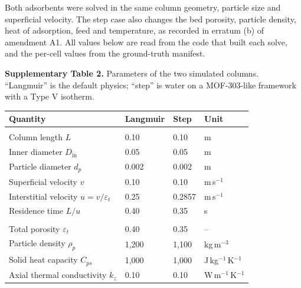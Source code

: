 Both adsorbents were solved in the same column geometry, particle size and superficial
velocity. The step case also changes the bed porosity, particle density, heat of adsorption,
feed and temperature, as recorded in erratum (b) of amendment A1. All values below are read
from the code that built each solve, and the per-cell values from the ground-truth manifest.

\begin{table}[htbp]
\centering
\footnotesize
\textbf{Supplementary Table 2.} Parameters of the two simulated columns. ``Langmuir'' is the
default physics; ``step'' is water on a MOF-303-like framework with a Type V isotherm.
\par\medskip
\begin{tabularx}{\textwidth}{@{}>{\raggedright\arraybackslash}Xlll@{}}
\toprule
Quantity & Langmuir & Step & Unit \\
\midrule
\multicolumn{4}{@{}l}{\textit{Geometry and flow}}\\
Column length $L$ & 0.10 & 0.10 & m \\
Inner diameter $D_{\mathrm{in}}$ & 0.05 & 0.05 & m \\
Particle diameter $d_p$ & 0.002 & 0.002 & m \\
Superficial velocity $v$ & 0.10 & 0.10 & m\,s$^{-1}$ \\
Interstitial velocity $u = v/\varepsilon_t$ & 0.25 & 0.2857 & m\,s$^{-1}$ \\
Residence time $L/u$ & 0.40 & 0.35 & s \\
\midrule
\multicolumn{4}{@{}l}{\textit{Bed and solid}}\\
Total porosity $\varepsilon_t$ & 0.40 & 0.35 & -- \\
Particle density $\rho_p$ & 1,200 & 1,100 & kg\,m$^{-3}$ \\
Solid heat capacity $C_{ps}$ & 1,000 & 1,000 & J\,kg$^{-1}$\,K$^{-1}$ \\
Axial thermal conductivity $k_z$ & 0.10 & 0.10 & W\,m$^{-1}$\,K$^{-1}$ \\

\end{tabularx}
\end{table}
